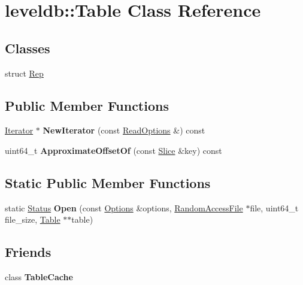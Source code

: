 \hypertarget{classleveldb_1_1_table}{}\section{leveldb\+::Table Class Reference}
\label{classleveldb_1_1_table}
\subsection*{Classes}
\begin{DoxyCompactItemize}
\item 
struct \mbox{\hyperlink{structleveldb_1_1_table_1_1_rep}{Rep}}
\end{DoxyCompactItemize}
\subsection*{Public Member Functions}
\begin{DoxyCompactItemize}
\item 
\mbox{\label{classleveldb_1_1_table_ae045deec05a0746abd0bddbb1442d890}} 
\mbox{\hyperlink{classleveldb_1_1_iterator}{Iterator}} $\ast$ {\bfseries New\+Iterator} (const \mbox{\hyperlink{structleveldb_1_1_read_options}{Read\+Options}} \&) const
\item 
\mbox{\label{classleveldb_1_1_table_ae9f828f621836e12d154cbe78d6fba3e}} 
uint64\+\_\+t {\bfseries Approximate\+Offset\+Of} (const \mbox{\hyperlink{classleveldb_1_1_slice}{Slice}} \&key) const
\end{DoxyCompactItemize}
\subsection*{Static Public Member Functions}
\begin{DoxyCompactItemize}
\item 
\mbox{\label{classleveldb_1_1_table_aa25d0e074ab4de46e583522a8c0e9582}} 
static \mbox{\hyperlink{classleveldb_1_1_status}{Status}} {\bfseries Open} (const \mbox{\hyperlink{structleveldb_1_1_options}{Options}} \&options, \mbox{\hyperlink{classleveldb_1_1_random_access_file}{Random\+Access\+File}} $\ast$file, uint64\+\_\+t file\+\_\+size, \mbox{\hyperlink{classleveldb_1_1_table}{Table}} $\ast$$\ast$table)
\end{DoxyCompactItemize}
\subsection*{Friends}
\begin{DoxyCompactItemize}
\item 
\mbox{\label{classleveldb_1_1_table_ae1e5f7bae4682672cfcc68d0add43199}} 
class {\bfseries Table\+Cache}
\end{DoxyCompactItemize}



